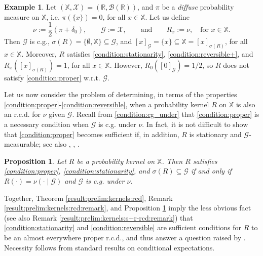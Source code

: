 \documentclass[a4paper]{article}
\theoremstyle{plain}
\newtheorem{proposition}[theorem]{Proposition}
\theoremstyle{remark}
\theoremstyle{definition}
\newtheorem{example}[theorem]{Example}
\begin{document}
\begin{example}\label{example:connections:improper}
Let $(\mathbb{X},\mathcal{X})=(\mathbb{R},\mathcal{B}(\mathbb{R}))$, and $\pi$ be a \textit{diffuse} probability measure on $\mathbb{X}$, i.e. $\pi(\{x\})=0$, for all $x\in\mathbb{X}$. Let us define
\[\nu:=\frac{1}{2}(\pi+\delta_0),\qquad\mathcal{G}:=\mathcal{X},\qquad\mbox{and}\qquad R_x:=\nu,\quad\mbox{for }x\in\mathbb{X}.\]
Then $\mathcal{G}$ is c.g., $\sigma(R)=\{\emptyset,\mathbb{X}\}\subseteq\mathcal{G}$, and $[x]_\mathcal{G}=\{x\}\subseteq\mathbb{X}=[x]_{\sigma(R)}$, for all $x\in\mathbb{X}$. Moreover, $R$ satisfies \eqref{condition:stationarity}, \eqref{condition:reversible+}, and $R_x([x]_{\sigma(R)})=1$, for all $x\in\mathbb{X}$. However, $R_0([0]_\mathcal{G})=1/2$, so $R$ does not satisfy \eqref{condition:proper} w.r.t. $\mathcal{G}$.
\end{example}

Let us now consider the problem of determining, in terms of the properties \eqref{condition:proper}-\eqref{condition:reversible}, when a probability kernel $R$ on $\mathbb{X}$ is also an r.c.d. for $\nu$ given $\mathcal{G}$. Recall from \eqref{condition:cg_under} that \eqref{condition:proper} is a necessary condition when $\mathcal{G}$ is c.g. under $\nu$. In fact, it is not difficult to show that \eqref{condition:proper} becomes sufficient if, in addition, $R$ is stationary and $\mathcal{G}$-measurable; see also \cite[][p.\,741]{blackwell1975}, \cite[][Lemma 1]{berti2013}, \cite[][Proposition 5.19]{einsielder2011}.

\begin{proposition}\label{result:prelim:kernels:total-rcd}
Let $R$ be a probability kernel on $\mathbb{X}$. Then $R$ satisfies \eqref{condition:proper}, \eqref{condition:stationarity}, and $\sigma(R)\subseteq\mathcal{G}$ if and only if $R(\cdot)=\nu(\cdot\mid\mathcal{G})$ and $\mathcal{G}$ is c.g. under $\nu$.
\end{proposition}

Together, Theorem \ref{result:prelim:kernels:rcd}, Remark \ref{result:prelim:kernels:rcd:remark}, and Proposition \ref{result:prelim:kernels:total-rcd} imply the less obvious fact (see also Remark \ref{result:prelim:kernels:s+r-rcd:remark}) that \eqref{condition:stationarity} and \eqref{condition:reversible} are sufficient conditions for $R$ to be an almost everywhere proper r.c.d., and thus answer a question raised by \citet[][p.\,11]{berti2023kernel}. Necessity follows from standard results on conditional expectations.
\end{document}
